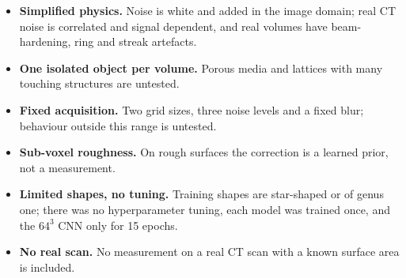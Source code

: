 \begin{itemize}\setlength\itemsep{1pt}
  \item \textbf{Simplified physics.} Noise is white and added in the image domain; real CT noise is
        correlated and signal dependent, and real volumes have beam-hardening, ring and streak artefacts.
  \item \textbf{One isolated object per volume.} Porous media and lattices with many touching
        structures are untested.
  \item \textbf{Fixed acquisition.} Two grid sizes, three noise levels and a fixed blur; behaviour
        outside this range is untested.
  \item \textbf{Sub-voxel roughness.} On rough surfaces the correction is a learned prior, not a
        measurement.
  \item \textbf{Limited shapes, no tuning.} Training shapes are star-shaped or of genus one; there was
        no hyperparameter tuning, each model was trained once, and the $64^3$ CNN only for 15 epochs.
  \item \textbf{No real scan.} No measurement on a real CT scan with a known surface area is included.
\end{itemize}
